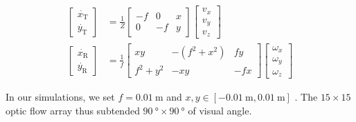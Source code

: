 \begin{align}
\begin{bmatrix}\dot{x_{\textrm{T}}} \\ \dot{y_{\textrm{T}}}\end{bmatrix} & = \frac{1}{Z} \begin{bmatrix}-f & 0 & x \\ 0 & -f & y\end{bmatrix} \begin{bmatrix}v_x \\ v_y \\ v_z\end{bmatrix} \label{eqn:MSTd|methods|flowT} \\
\begin{bmatrix}\dot{x_{\textrm{R}}} \\ \dot{y_{\textrm{R}}}\end{bmatrix} & = \frac{1}{f} \begin{bmatrix}xy & -(f^2+x^2) & fy \\ f^2+y^2 & -xy & -fx\end{bmatrix} \begin{bmatrix}\omega_x \\ \omega_y \\ \omega_z\end{bmatrix} \label{eqn:MSTd|methods|flowR}
\end{align}

In our simulations, we set $f=\SI{0.01}{\meter}$ and 
$x,y \in [\SI{-0.01}{\meter},\SI{0.01}{\meter}]$
\citep{RaudiesNeumann2012}. The $15 \times 15$ optic flow array thus subtended
$\SI{90}{\degree} \times \SI{90}{\degree}$ of visual angle.

